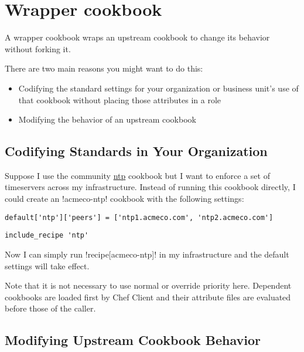 \section{Wrapper cookbook}
\label{sec:tat-wrapper-cookbook}

A wrapper cookbook wraps an upstream cookbook to change its behavior without forking it.

There are two main reasons you might want to do this:

\begin{itemize}
  \item Codifying the standard settings for your organization or business unit’s use of that cookbook without placing those attributes in a role
  \item Modifying the behavior of an upstream cookbook
\end{itemize}


\subsection{Codifying Standards in Your Organization}

Suppose I use the community \href{https://supermarket.getchef.com/cookbooks/ntp}{ntp} cookbook but I want to enforce a set of timeservers across my infrastructure. Instead of running this cookbook directly, I could create an \inline!acmeco-ntp! cookbook with the following settings:

\begin{lstlisting}[label=lst:wrapper-cookbook1,caption=acmeco-ntp/attributes/default.rb]
default['ntp']['peers'] = ['ntp1.acmeco.com', 'ntp2.acmeco.com']
\end{lstlisting}

\begin{lstlisting}[label=lst:wrapper-cookbook2,caption=acmeco-ntp/recipes/default.rb]
include_recipe 'ntp'
\end{lstlisting}

Now I can simply run \inline!recipe[acmeco-ntp]! in my infrastructure and the default settings will take effect.

Note that it is not necessary to use normal or override priority here. Dependent cookbooks are loaded first by Chef Client and their attribute files are evaluated before those of the caller.


\subsection{Modifying Upstream Cookbook Behavior}

